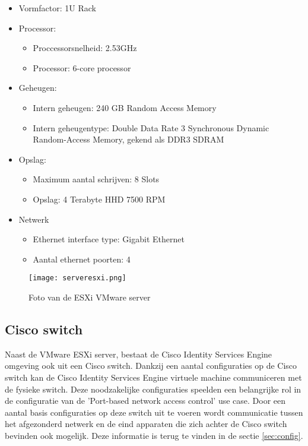 \begin{itemize}
	\item Vormfactor: 1U Rack
	\item Processor:
	\begin{itemize}
		\item Proccessorsnelheid: 2.53GHz
		\item Processor: 6-core processor
	\end{itemize}
	\item Geheugen:
	\begin{itemize}
		\item Intern geheugen: 240 GB Random Access Memory
		\item Intern geheugentype: Double Data Rate 3 Synchronous Dynamic Random-Access Memory, gekend als DDR3 SDRAM
	\end{itemize}
	\item Opslag:
	\begin{itemize}
		\item Maximum aantal schrijven: 8 Slots
		\item Opslag: 4 Terabyte HHD 7500 RPM
	\end{itemize}
	\item Netwerk
	\begin{itemize}
		\item Ethernet interface type: Gigabit Ethernet
		\item Aantal ethernet poorten: 4 
	\end{itemize}
\end{itemize}

\begin{figure}[H]
	\centering
	\texttt{[image: serveresxi.png]}
	\caption{Foto van de ESXi VMware server}
	\label{fig:VmwareSer}
\end{figure}

\subsection{Cisco switch}
Naast de VMware ESXi server, bestaat de Cisco Identity Services Engine omgeving ook uit een Cisco switch. Dankzij een aantal configuraties op de Cisco switch kan de Cisco Identity Services Engine virtuele machine communiceren met de fysieke switch. Deze noodzakelijke configuraties speelden een belangrijke rol in de configuratie van de 'Port-based network access control' use case. 
\newline
\newline
Door een aantal basis configuraties op deze switch uit te voeren wordt communicatie tussen het afgezonderd netwerk en de eind apparaten die zich achter de Cisco switch bevinden ook mogelijk. Deze informatie is terug te vinden in de sectie \ref{sec:config}.

